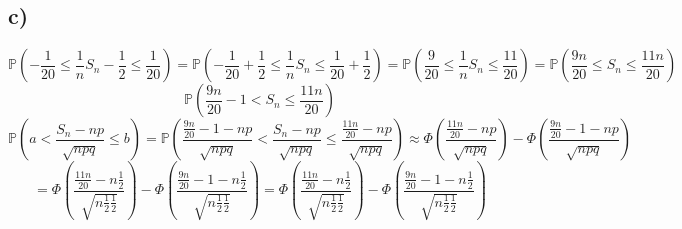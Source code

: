 \documentclass{article} %
\newcommand{\mab}[1]{\[ #1 \]}
\newcommand{\p}[0]{\mathbb{P}}
\begin{document}
\subsection*{c)}
\mab{
\p(-\frac{1}{20} \leq \frac{1}{n} S_n - \frac{1}{2} \leq \frac{1}{20}) 
=
\p(-\frac{1}{20} + \frac{1}{2} \leq \frac{1}{n} S_n \leq \frac{1}{20} + \frac{1}{2}) 
= 
\p(\frac{9}{20} \leq \frac{1}{n} S_n \leq \frac{11}{20})  
= 
\p(\frac{9n}{20} \leq  S_n \leq \frac{11n}{20})
}
\mab{\p(\frac{9n}{20} -1  <  S_n \leq \frac{11n}{20})}
\mab{
\p(a < \frac{S_n - np}{\sqrt{npq}} \leq b) = \p(\frac{\frac{9n}{20} -1  - np}{\sqrt{npq}} < \frac{S_n - np}{\sqrt{npq}} \leq \frac{\frac{11n}{20} - np}{\sqrt{npq}}) \approx  \Phi(\frac{\frac{11n}{20} - np}{\sqrt{npq}}) - \Phi(\frac{\frac{9n}{20} -1  - np}{\sqrt{npq}}) 
}
\mab{ = \Phi(\frac{\frac{11n}{20} - n\frac{1}{2}}{\sqrt{n\frac{1}{2}\frac{1}{2}}}) - \Phi(\frac{\frac{9n}{20} -1  - n\frac{1}{2}}{\sqrt{n\frac{1}{2}\frac{1}{2}}})
= \Phi(\frac{\frac{11n}{20} - n\frac{1}{2}}{\sqrt{n\frac{1}{2}\frac{1}{2}}}) - \Phi(\frac{\frac{9n}{20} -1  - n\frac{1}{2}}{\sqrt{n\frac{1}{2}\frac{1}{2}}})
}
\end{document}
